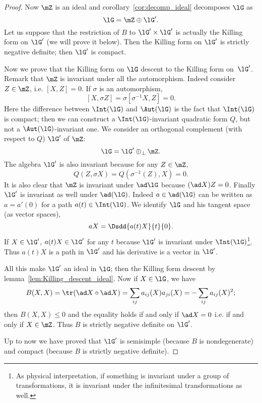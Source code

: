 \begin{theorem}
\begin{proof}
	Now $\mZ$ is an ideal and corollary~\ref{cor:decomp_ideal} decomposes $\lG$ as
	\begin{equation}
		\lG=\mZ\oplus\lG'.
	\end{equation}
	Let us suppose that the restriction of $B$ to $\lG'\times\lG'$ is actually the Killing form on $\lG'$ (we will prove it below). Then the Killing form on $\lG'$ is strictly negative definite; then $\lG'$ is compact.

	Now we prove that the Killing form on $\lG$ descent to the Killing form on~$\lG'$. Remark that $\mZ$ is invariant under all the automorphism. Indeed consider $Z\in\mZ$, i.e.  $[X,Z]=0$. If $\sigma$ is an automorphism,
	\[
		[X,\sigma Z]=\sigma[\sigma^{-1} X,Z]=0.
	\]
	Here the difference between $\Int(\lG)$ and $\Aut(\lG)$ is the fact that $\Int(\lG)$ is compact; then we can construct a $\Int(\lG)$-invariant quadratic form $Q$, but not a $\Aut(\lG)$-invariant one. We consider an orthogonal complement (with respect to $Q$) $\lG'$ of $\mZ$:
	\begin{equation}
		\lG=\lG'\oplus_{\perp}\mZ.
	\end{equation}
	The algebra $\lG'$ is also invariant because for any $Z\in\mZ$,
	\[
		Q(Z,\sigma X)=Q(\sigma^{-1}(Z),X)=0.
	\]
	It is also clear that $\mZ$ is invariant under $\ad\lG$ because $(\ad X)Z=0$. Finally $\lG'$ is invariant as well under $\ad(\lG)$. Indeed $a\in\ad(\lG)$ can be written as $a=a'(0)$ for a path $a(t)\in\Int(\lG)$. We identify $\lG$ and his tangent space (as vector spaces),
	\[
		aX=\Dsdd{ a(t)X }{t}{0}.
	\]
	If $X\in\lG'$, $a(t)X\in\lG'$ for any $t$ because $\lG'$ is invariant under $\Int(\lG)$\footnote{As physical interpretation, if something is invariant under a group of transformations, it is invariant under the infinitesimal transformations as well.}. Thus $a(t)X$ is a path in $\lG'$ and his derivative is a vector in $\lG'$.

	All this make $\lG'$ an ideal in $\lG$; then the Killing form descent by lemma~\ref{lem:Killing_descent_ideal}. Now if $X\in\lG$, we have
	\begin{equation}
		B(X,X)=\tr(\ad X\circ\ad X)
		=\sum_{ij}a_{ij}(X)a_{ji}(X)
		=-\sum_{ij}a_{ij}(X)^2;
	\end{equation}
	then $B(X,X)\leq 0$ and the equality holds if and only if $\ad X=0$ i.e. if and only if $X\in\mZ$. Thus $B$ is strictly negative definite on $\lG'$.

	Up to now we have proved that $\lG'$ is semisimple (because $B$ is nondegenerate) and compact (because $B$ is strictly negative definite).


\end{proof}
\end{theorem}
